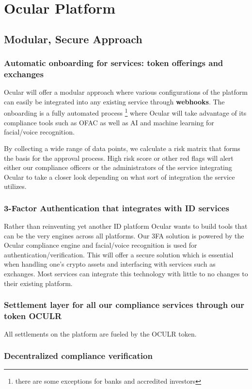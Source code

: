 \documentclass[a4paper]{article}
\begin{document}
\section{Ocular Platform}
\subsection{Modular, Secure Approach}
\subsubsection*{Automatic onboarding for services: token offerings and exchanges}
Ocular will offer a modular approach where various configurations of the platform can easily be integrated into any existing service through \textbf{webhooks}. The onboarding is a fully automated process \footnote{there are some exceptions for banks and accredited investors} where Ocular will take advantage of its compliance tools such as OFAC as well as AI and machine learning for facial/voice recognition. 

By collecting a wide range of data points, we calculate a risk matrix that forms the basis for the approval process. High risk score or other red flags will alert either our compliance officers or the administrators of the service integrating Ocular to take a closer look depending on what sort of integration the service utilizes.

\subsubsection*{3-Factor Authentication that integrates with ID services}
Rather than reinventing yet another ID platform Ocular wants to build tools that can be the very engines across all platforms. Our 3FA solution is powered by the Ocular compliance engine and facial/voice recognition is used for authentication/verification. This will offer a secure solution which is essential when handling one's crypto assets and interfacing with services such as exchanges. Most services can integrate this technology with little to no changes to their existing platform. 


\subsubsection*{Settlement layer for all our compliance services through our token OCULR}
All settlements on the platform are fueled by the OCULR token. 

\subsubsection*{Decentralized compliance verification}
\end{document}
